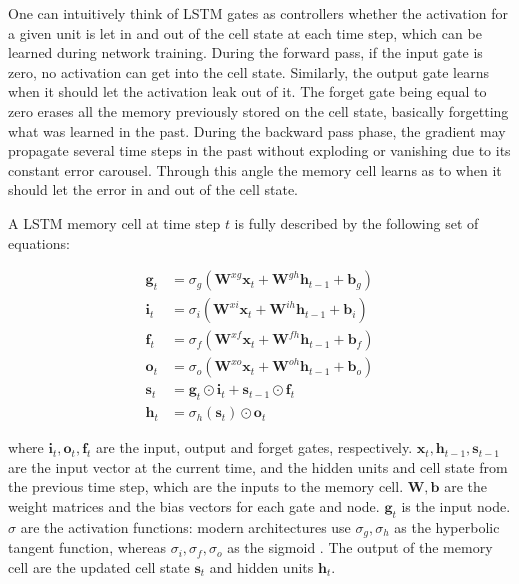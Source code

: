 \documentclass{kththesis}
\begin{document}
One can intuitively think of LSTM gates as controllers whether the activation for a given unit is let in and out of the cell state at each time step, which can be learned during network training. During the forward pass, if the input gate is zero, no activation can get into the cell state. Similarly, the output gate learns when it should let the activation leak out of it. The forget gate being equal to zero erases all the memory previously stored on the cell state, basically forgetting what was learned in the past. During the backward pass phase, the gradient may propagate several time steps in the past without exploding or vanishing due to its constant error carousel. Through this angle the memory cell learns as to when it should let the error in and out of the cell state.

A LSTM memory cell at time step $t$ is fully described by the following set of equations:

\begin{equation}
\begin{aligned} 
\mathbf{g}_t &= \sigma_g(\mathbf{W}^{xg}\mathbf{x}_t + \mathbf{W}^{gh}\mathbf{h}_{t-1}+\mathbf{b}_g) \\ 
\mathbf{i}_t &= \sigma_i(\mathbf{W}^{xi}\mathbf{x}_t + \mathbf{W}^{ih}\mathbf{h}_{t-1}+\mathbf{b}_i) \\
\mathbf{f}_t &= \sigma_f(\mathbf{W}^{xf}\mathbf{x}_t + \mathbf{W}^{fh}\mathbf{h}_{t-1}+\mathbf{b}_f) \\
\mathbf{o}_t &= \sigma_o(\mathbf{W}^{xo}\mathbf{x}_t + \mathbf{W}^{oh}\mathbf{h}_{t-1}+\mathbf{b}_o) \\
\mathbf{s}_t &= \mathbf{g}_t \odot \mathbf{i}_t + \mathbf{s}_{t-1} \odot \mathbf{f}_t \\
\mathbf{h}_t &=  \sigma_h(\mathbf{s}_t) \odot \mathbf{o}_t
\end{aligned}
\end{equation}

where $\mathbf{i}_t, \mathbf{o}_t, \mathbf{f}_t$ are the input, output and forget gates, respectively. $\mathbf{x}_t, \mathbf{h}_{t-1}, \mathbf{s}_{t-1}$ are the input vector at the current time, and the hidden units and cell state from the previous time step, which are the inputs to the memory cell. $\mathbf{W}, \mathbf{b}$ are the weight matrices and the bias vectors for each gate and node. $\mathbf{g}_t$ is the input node. $\sigma$ are the activation functions: modern architectures use $\sigma_g,\sigma_h$ as the hyperbolic tangent function, whereas $\sigma_i,\sigma_f,\sigma_o$ as the sigmoid \citep{zaremba2014learning}. The output of the memory cell are the updated cell state $\mathbf{s}_t$ and hidden units $\mathbf{h}_t$.
\end{document}
